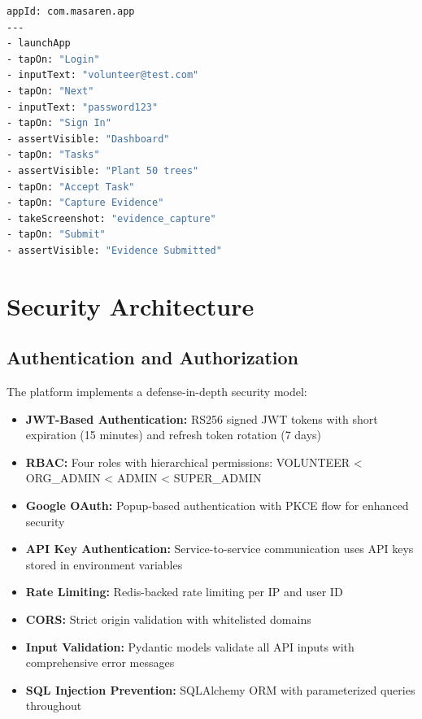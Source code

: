 \documentclass[11pt,a4paper]{article}
\begin{document}
\begin{lstlisting}[language=bash, caption=Mobile E2E Flow]
appId: com.masaren.app
---
- launchApp
- tapOn: "Login"
- inputText: "volunteer@test.com"
- tapOn: "Next"
- inputText: "password123"
- tapOn: "Sign In"
- assertVisible: "Dashboard"
- tapOn: "Tasks"
- assertVisible: "Plant 50 trees"
- tapOn: "Accept Task"
- tapOn: "Capture Evidence"
- takeScreenshot: "evidence_capture"
- tapOn: "Submit"
- assertVisible: "Evidence Submitted"
\end{lstlisting}

\clearpage

\section{Security Architecture}

\subsection{Authentication and Authorization}

The platform implements a defense-in-depth security model:

\begin{itemize}
  \item \textbf{JWT-Based Authentication:} RS256 signed JWT tokens with short expiration (15 minutes) and refresh token rotation (7 days)
  \item \textbf{RBAC:} Four roles with hierarchical permissions: VOLUNTEER < ORG\_ADMIN < ADMIN < SUPER\_ADMIN
  \item \textbf{Google OAuth:} Popup-based authentication with PKCE flow for enhanced security
  \item \textbf{API Key Authentication:} Service-to-service communication uses API keys stored in environment variables
  \item \textbf{Rate Limiting:} Redis-backed rate limiting per IP and user ID
  \item \textbf{CORS:} Strict origin validation with whitelisted domains
  \item \textbf{Input Validation:} Pydantic models validate all API inputs with comprehensive error messages
  \item \textbf{SQL Injection Prevention:} SQLAlchemy ORM with parameterized queries throughout
\end{itemize}
\end{document}
